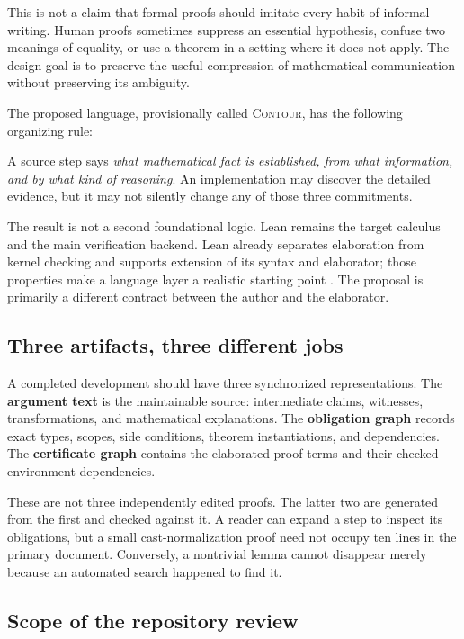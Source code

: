 \documentclass[11pt,a4paper]{article}
\newcommand{\contour}{\textsc{Contour}}
\begin{document}
This is not a claim that formal proofs should imitate every habit of informal writing. Human proofs sometimes suppress an essential hypothesis, confuse two meanings of equality, or use a theorem in a setting where it does not apply. The design goal is to preserve the useful compression of mathematical communication without preserving its ambiguity.

The proposed language, provisionally called \contour{}, has the following organizing rule:
\begin{principle}
A source step says \emph{what mathematical fact is established, from what information, and by what kind of reasoning}. An implementation may discover the detailed evidence, but it may not silently change any of those three commitments.
\end{principle}

The result is not a second foundational logic. Lean remains the target calculus and the main verification backend. Lean already separates elaboration from kernel checking and supports extension of its syntax and elaborator; those properties make a language layer a realistic starting point \cite{leanreference,lean4paper}. The proposal is primarily a different contract between the author and the elaborator.

\subsection{Three artifacts, three different jobs}

A completed development should have three synchronized representations. The \textbf{argument text} is the maintainable source: intermediate claims, witnesses, transformations, and mathematical explanations. The \textbf{obligation graph} records exact types, scopes, side conditions, theorem instantiations, and dependencies. The \textbf{certificate graph} contains the elaborated proof terms and their checked environment dependencies.

These are not three independently edited proofs. The latter two are generated from the first and checked against it. A reader can expand a step to inspect its obligations, but a small cast-normalization proof need not occupy ten lines in the primary document. Conversely, a nontrivial lemma cannot disappear merely because an automated search happened to find it.

\subsection{Scope of the repository review}
\end{document}
